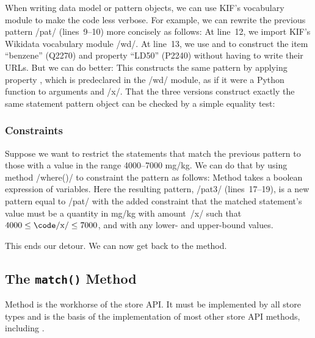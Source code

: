 When writing data model or pattern objects, we can use KIF's vocabulary module to make the code less verbose.
For example, we can rewrite the previous pattern \code/pat/ (lines~9--10) more concisely as follows:
%
At line~12, we import KIF's Wikidata vocabulary module \code/wd/.
At line~13, we use  and  to construct the item ``benzene'' (Q2270) and property ``LD50'' (P2240) without having to write their URLs.
But we can do better:
%
This constructs the same pattern by applying property , which is predeclared in the \code/wd/ module, as if it were a Python function to arguments  and \code/x/.
That the three versions construct exactly the same statement pattern object can be checked by a simple equality test:
%


\subsubsection{Constraints}


Suppose we want to restrict the statements that match the previous pattern to those with a value in the range 4000--7000 mg/kg.
We can do that by using method \code/where()/ to constraint the pattern as follows:
%
Method  takes a boolean expression of variables.
Here the resulting pattern, \code/pat3/ (lines~17--19), is a new pattern equal to \code/pat/ with the added constraint that the matched statement's value must be a quantity in mg/kg with amount~\code/x/ such that $4000\le\text{\code/x/}\le7000$, and with any lower- and upper-bound values.




This ends our detour.  We can now get back to the  method.


\subsection{The \texttt{match()} Method}%
\label{sub:the-match-call}


Method  is the workhorse of the store API\@.
It must be implemented by all store types and is the basis of the implementation of most other store API methods, including .


